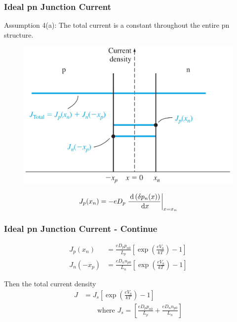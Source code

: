 \documentclass{beamer}
\begin{document}
    \begin{frame} \frametitle{Ideal pn Junction Current}
        \par Assumption 4(a): The total current is a constant throughout the entire pn structure.
        \begin{figure}[H]
            \centering
            \includegraphics[width=0.6\linewidth]{Current-density.jpg}
            \label{fig:Current-density.jpg}
        \end{figure}
        \begin{equation*}
            J_p(x_n) = - e D_p \left. \frac{\: \mathrm{d} \left( \delta p_n(x) \right)}{\: \mathrm{d} x} \right|_{x = x_n}
        \end{equation*}
    \end{frame}
    \begin{frame} \frametitle{Ideal pn Junction Current - Continue}
        \begin{equation*}
            \begin{aligned}
                J_{p} (x_n) &= \frac{e D_p p_{n0}}{L_p} \left[ \exp\left( \frac{eV_a}{kT}  \right) - 1 \right] \\
                J_{n} (-x_p) &= \frac{eD_n n_{p0} }{L_n} \left[ \exp\left( \frac{eV_a}{kT}  \right) - 1 \right]
            \end{aligned}
        \end{equation*}
        \par Then the total current density
        \begin{equation*}
            \boxed{
                \begin{aligned}
                    J &= J_s \left[ \exp\left( \frac{eV_a}{kT}  \right) - 1 \right] \\
                    & \qquad  \text{where } J_s = \left[ \frac{eD_p p_{n0} }{L_p} + \frac{eD_n n_{p0} }{L_n}  \right]
                \end{aligned}
            }
        \end{equation*}
    \end{frame}
\end{document}
